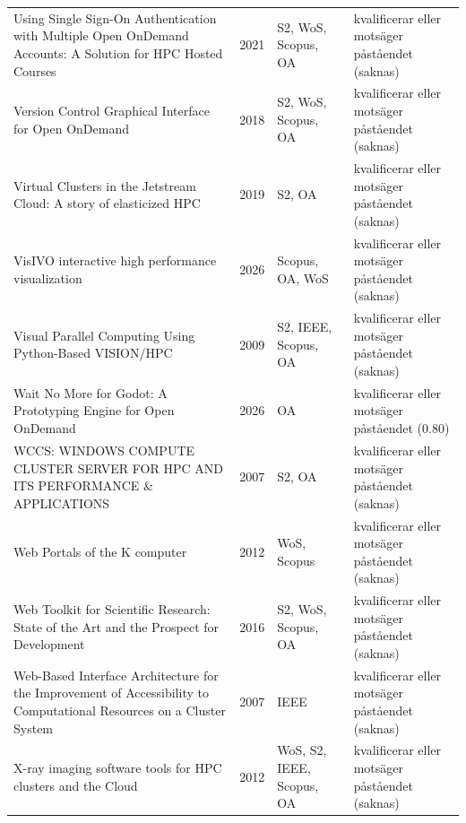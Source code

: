 \begin{longtable}{@{}%
  >{\raggedright\arraybackslash}p{}c%
  >{\raggedright\arraybackslash}p{}%
  >{\raggedright\arraybackslash}p{}@{}}
Using Single Sign-On Authentication with Multiple Open OnDemand Accounts: A Solution for HPC Hosted Courses & 2021 & S2, WoS, Scopus, OA & kvalificerar eller motsäger påståendet (saknas) \\
Version Control Graphical Interface for Open OnDemand & 2018 & S2, WoS, Scopus, OA & kvalificerar eller motsäger påståendet (saknas) \\
Virtual Clusters in the Jetstream Cloud: A story of elasticized HPC & 2019 & S2, OA & kvalificerar eller motsäger påståendet (saknas) \\
VisIVO interactive high performance visualization & 2026 & Scopus, OA, WoS & kvalificerar eller motsäger påståendet (saknas) \\
Visual Parallel Computing Using Python-Based VISION/HPC & 2009 & S2, IEEE, Scopus, OA & kvalificerar eller motsäger påståendet (saknas) \\
Wait No More for Godot: A Prototyping Engine for Open OnDemand & 2026 & OA & kvalificerar eller motsäger påståendet (0.80) \\
WCCS: WINDOWS COMPUTE CLUSTER SERVER FOR HPC AND ITS PERFORMANCE \& APPLICATIONS & 2007 & S2, OA & kvalificerar eller motsäger påståendet (saknas) \\
Web Portals of the K computer & 2012 & WoS, Scopus & kvalificerar eller motsäger påståendet (saknas) \\
Web Toolkit for Scientific Research: State of the Art and the Prospect for Development & 2016 & S2, WoS, Scopus, OA & kvalificerar eller motsäger påståendet (saknas) \\
Web-Based Interface Architecture for the Improvement of Accessibility to Computational Resources on a Cluster System & 2007 & IEEE & kvalificerar eller motsäger påståendet (saknas) \\
X-ray imaging software tools for HPC clusters and the Cloud & 2012 & WoS, S2, IEEE, Scopus, OA & kvalificerar eller motsäger påståendet (saknas) \\
\end{longtable}
\endgroup
